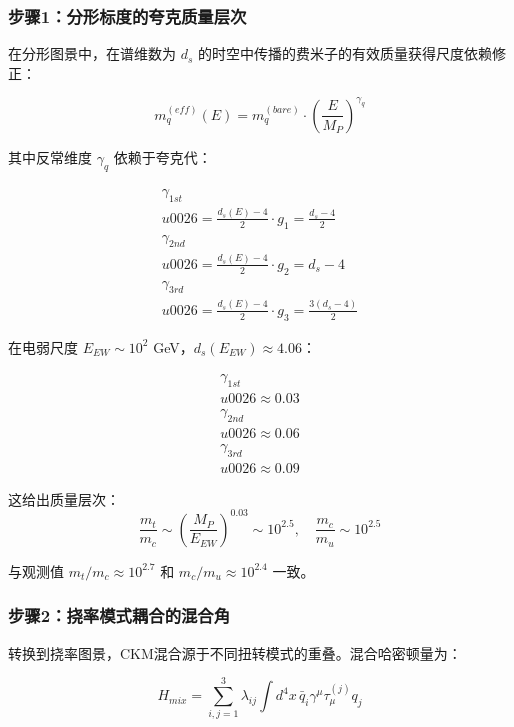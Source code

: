 \subsubsection{步骤1：分形标度的夸克质量层次}

在分形图景中，在谱维数为 $d_s$ 的时空中传播的费米子的有效质量获得尺度依赖修正：

\begin{equation}
    m_q^{(eff)}(E) = m_q^{(bare)} \cdot \left(\frac{E}{M_P}\right)^{\gamma_q}
\end{equation}

其中反常维度 $\gamma_q$ 依赖于夸克代：

\begin{align}
    \gamma_{1st} \\u0026= \frac{d_s(E) - 4}{2} \cdot g_1 = \frac{d_s - 4}{2} \\
    \gamma_{2nd} \\u0026= \frac{d_s(E) - 4}{2} \cdot g_2 = d_s - 4 \\
    \gamma_{3rd} \\u0026= \frac{d_s(E) - 4}{2} \cdot g_3 = \frac{3(d_s - 4)}{2}
\end{align}

在电弱尺度 $E_{EW} \sim 10^2$ GeV，$d_s(E_{EW}) \approx 4.06$：

\begin{align}
    \gamma_{1st} \\u0026\approx 0.03 \\
    \gamma_{2nd} \\u0026\approx 0.06 \\
    \gamma_{3rd} \\u0026\approx 0.09
\end{align}

这给出质量层次：
\begin{equation}
    \frac{m_t}{m_c} \sim \left(\frac{M_P}{E_{EW}}\right)^{0.03} \sim 10^{2.5}, \quad
    \frac{m_c}{m_u} \sim 10^{2.5}
\end{equation}

与观测值 $m_t/m_c \approx 10^{2.7}$ 和 $m_c/m_u \approx 10^{2.4}$ 一致。

\subsubsection{步骤2：挠率模式耦合的混合角}

转换到挠率图景，CKM混合源于不同扭转模式的重叠。混合哈密顿量为：

\begin{equation}
    H_{mix} = \sum_{i,j=1}^3 \lambda_{ij} \int d^4x \, \bar{q}_i \gamma^\mu \tau_\mu^{(j)} q_j
\end{equation}

